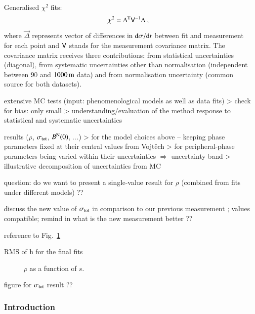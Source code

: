 Generalised $\chi^2$ fits:
\begin{equation}
\label{eq:chi sq}
	\chi^2 = \Delta^{\rm T} \mathsf{V}^{-1} \Delta\ ,
\end{equation}
where $\vec\Delta$ represents vector of differences in ${\rm d}\sigma/{\rm d} t$ between fit and measurement for each point and $\mathsf{V}$ stands for the measurement covariance matrix. The covariance matrix receives three contributions: from statistical uncertainties (diagonal), from systematic uncertainties other than normalisation (independent between $90$ and $1000\,{\rm m}$ data) and from normalisation uncertainty (common source for both datasets).

\> extensive MC tests (input: phenomenological models as well as data fits)
\>> check for bias: only small
\>> understanding/evaluation of the method response to statistical and systematic uncertainties

\> results ($\rho$, $\sigma_{\rm tot}$, $B^{\rm N}(0)$, ...)
\>> for the model choices above -- keeping phase parameters fixed at their central values from Vojt\v ech
\>> for peripheral-phase parameters being varied within their uncertainties $\Rightarrow$ uncertainty band
\>> illustrative decomposition of uncertainties from MC

\> question: do we want to present a single-value result for $\rho$ (combined from fits under different models) ??

\> discuss the new value of $\sigma_{\rm tot}$ in comparison to our previous measurement \cite{prl111}; values compatible; remind in what is the new measurement better ??

\> reference to Fig.~\ref{fig:rho_s}

\> RMS of b for the final fits

\begin{figure}
\begin{center}
\vspace*{3cm}
\vskip-3mm
\caption{$\rho$ as a function of $s$.}
\label{fig:rho_s}
\end{center}
\end{figure}

\> figure for $\sigma_{\rm tot}$ result ??





\subsubsection{Introduction}


